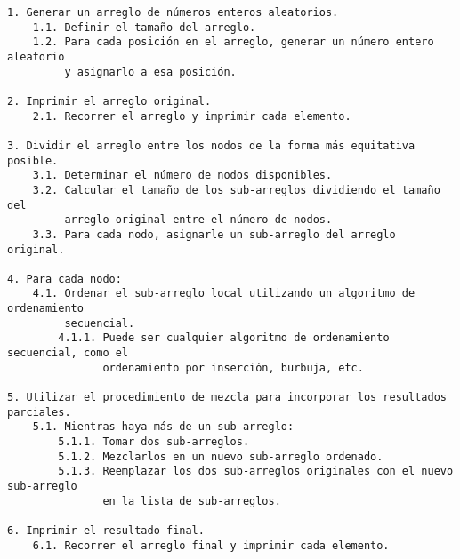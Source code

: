 \documentclass[a4paper,12pt]{article}
\begin{document}
\begin{verbatim}
1. Generar un arreglo de números enteros aleatorios.
    1.1. Definir el tamaño del arreglo.
    1.2. Para cada posición en el arreglo, generar un número entero aleatorio
         y asignarlo a esa posición.

2. Imprimir el arreglo original.
    2.1. Recorrer el arreglo y imprimir cada elemento.

3. Dividir el arreglo entre los nodos de la forma más equitativa posible.
    3.1. Determinar el número de nodos disponibles.
    3.2. Calcular el tamaño de los sub-arreglos dividiendo el tamaño del 
         arreglo original entre el número de nodos.
    3.3. Para cada nodo, asignarle un sub-arreglo del arreglo original.

4. Para cada nodo:
    4.1. Ordenar el sub-arreglo local utilizando un algoritmo de ordenamiento
         secuencial.
        4.1.1. Puede ser cualquier algoritmo de ordenamiento secuencial, como el
               ordenamiento por inserción, burbuja, etc.

5. Utilizar el procedimiento de mezcla para incorporar los resultados parciales.
    5.1. Mientras haya más de un sub-arreglo:
        5.1.1. Tomar dos sub-arreglos.
        5.1.2. Mezclarlos en un nuevo sub-arreglo ordenado.
        5.1.3. Reemplazar los dos sub-arreglos originales con el nuevo sub-arreglo
               en la lista de sub-arreglos.

6. Imprimir el resultado final.
    6.1. Recorrer el arreglo final y imprimir cada elemento.
\end{verbatim}

\end{document}
